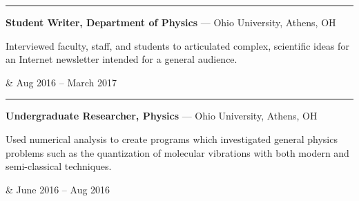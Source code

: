 \documentclass[10pt]{article}
\begin{document}
{\begin{tabular}
	\rule{-9pt}{0ex}\textbf{
	Student Writer, Department of Physics
	}{\color{gray} --- 
	Ohio University, Athens, OH
	}
	\begin{description}
		{\color{darkgray}
		\item[\hspace{8pt} $\bullet$\hspace{3.5pt}]
		Interviewed faculty, staff, and students to articulated complex, scientific ideas for an Internet newsletter intended for a general audience.	
		}
	\end{description} &
	Aug 2016 -- March 2017\\
	
	\rule{-9pt}{0ex}\textbf{
	Undergraduate Researcher, Physics
	}{\color{gray} --- 
	Ohio University, Athens, OH
	}
	\begin{description}
		{\color{darkgray}
		\item[\hspace{8pt} $\bullet$\hspace{4pt}]
		Used numerical analysis to create programs which investigated general physics problems such as the quantization of molecular vibrations with both modern and semi-classical techniques.
		}
	\end{description} &
	June 2016 -- Aug 2016\\
\end{tabular}
}


\vspace{-6pt} \noindent \hrulefill
\end{document}
